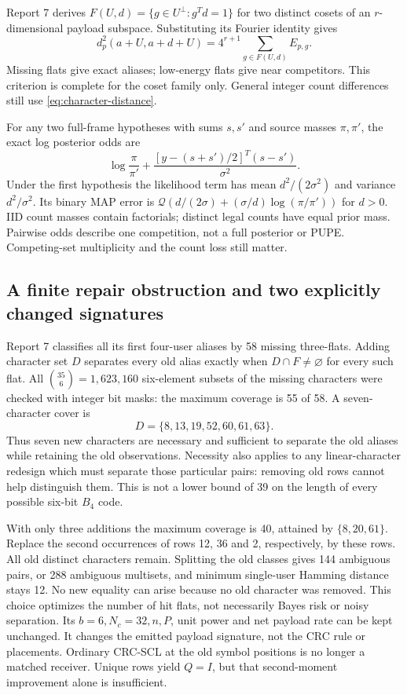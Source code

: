 \documentclass[10pt,a4paper]{article}
\begin{document}
Report 7 derives $F(U,d)=\{g\in U^\perp:g^Td=1\}$ for two distinct cosets of an
$r$-dimensional payload subspace. Substituting its Fourier identity gives
\begin{equation}
 \boxed{d_p^2(a+U,a+d+U)=4^{r+1}\sum_{g\in F(U,d)} E_{p,g}.}
 \label{eq:flat-distance}
\end{equation}
Missing flats give exact aliases; low-energy flats give near competitors. This criterion is complete
for the coset family only. General integer count differences still use \eqref{eq:character-distance}.

For any two full-frame hypotheses with sums $s,s'$ and source masses $\pi,\pi'$, the exact log posterior
odds are
\begin{equation}
 \log\frac{\pi}{\pi'}+
 \frac{[y-(s+s')/2]^T(s-s')}{\sigma^2}.
 \label{eq:binary-odds}
\end{equation}
Under the first hypothesis the likelihood term has mean $d^2/(2\sigma^2)$ and variance $d^2/\sigma^2$.
Its binary MAP error is $\mathcal Q(d/(2\sigma)+(\sigma/d)\log(\pi/\pi'))$ for $d>0$.
IID count masses contain factorials; distinct legal counts have equal prior mass. Pairwise odds describe
one competition, not a full posterior or PUPE. Competing-set multiplicity and the count loss still matter.

\subsection{A finite repair obstruction and two explicitly changed signatures}
Report 7 classifies all its first four-user aliases by 58 missing three-flats. Adding character set $D$
separates every old alias exactly when $D\cap F\ne\varnothing$ for every such flat.
All $\binom{35}{6}=1,623,160$ six-element subsets of the missing characters were checked with integer
bit masks: the maximum coverage is 55 of 58. A seven-character cover is
\[
 D=\{8,13,19,52,60,61,63\}.
\]
Thus seven new characters are necessary and sufficient to separate the old aliases while retaining
the old observations. Necessity also applies to any linear-character redesign which must separate those particular
pairs: removing old rows cannot help distinguish them. This is not a lower bound of 39 on the length
of every possible six-bit $B_4$ code.

With only three additions the maximum coverage is 40, attained by $\{8,20,61\}$.
Replace the second occurrences of rows 12, 36 and 2, respectively, by these rows. All old distinct
characters remain. Splitting the old classes gives 144 ambiguous pairs, or 288 ambiguous multisets,
and minimum single-user Hamming distance stays 12. No new equality can arise because no old character
was removed. This choice optimizes the number of hit flats, not necessarily Bayes risk or noisy separation.
Its $b=6,N_c=32,n,P$, unit power and net payload rate can be kept unchanged. It changes the emitted
payload signature, not the CRC rule or placements. Ordinary CRC-SCL at the old symbol positions is
no longer a matched receiver. Unique rows yield $Q=I$, but that second-moment improvement alone is insufficient.
\end{document}
